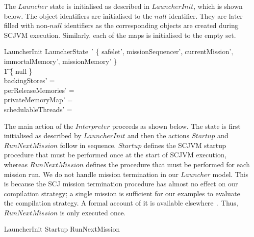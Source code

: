 The $Launcher$ state is initialised as described in $LauncherInit$,
which is shown below.
The object identifiers are initialised to the $null$ identifier.
They are later filled with non-$null$ identifiers as the corresponding
objects are created during SCJVM execution.
Similarly, each of the maps is initialised to the empty set.
\begin{schema}{LauncherInit}
	LauncherState~'
\where
	\{ safelet', missionSequencer', currentMission', immortalMemory', missionMemory' \} \\
	\t1 {} \subseteq \{ null \} \\
	backingStores' = \emptyset \\
	perReleaseMemories' = \emptyset \\
	privateMemoryMap' = \emptyset \\
	schedulableThreads' = \emptyset
\end{schema}

The main action of the $Interpreter$ proceeds as shown below.
The state is first initialised as described by $LauncherInit$ and then
the actions $Startup$ and $RunNextMission$ follow in sequence.
$Startup$ defines the SCJVM startup procedure that must be performed
once at the start of SCJVM execution, whereas $RunNextMission$ defines
the procedure that must be performed for each mission run.
We do not handle mission termination in our $Launcher$ model.
This is because the SCJ mission termination procedure has almost no
effect on our compilation strategy; a single mission is sufficient for
our examples to evaluate the compilation strategy.
A formal account of it is available elsewhere~\cite{cavalcanti2013,
  luckcuck2016, zeyda2011}. 
Thus, $RunNextMission$ is only executed once.
\begin{circusaction}
  \circspot \lschexpract LauncherInit \rschexpract \circseq Startup \circseq RunNextMission
\end{circusaction}

